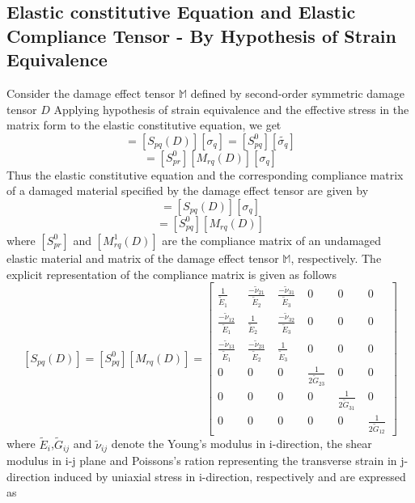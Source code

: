 \subsection{Elastic constitutive Equation and Elastic Compliance Tensor - By Hypothesis of Strain Equivalence}
\indent\indent\indent  Consider the damage effect tensor $\mathbb{M}$ defined by second-order symmetric damage tensor $D$ Applying hypothesis of strain equivalence and the effective stress in the matrix form to the elastic constitutive equation, we get
\begin{equation}
[\epsilon_{p}]  =  [S_{pq} (D)][\sigma_{q}]  =  [S_{pq}^{0}][\tilde{\sigma_{q}}]
\end{equation}
\begin{equation}
                =  [S_{pr}^{0}] [M_{rq} (D)][\sigma_{q}]
\end{equation}
Thus the elastic constitutive equation and the corresponding compliance matrix of a damaged material specified by the damage effect tensor are given by
\begin{equation}
[\epsilon_{p}]  =  [S_{pq} (D)][\sigma_{q}]
\end{equation}
\begin{equation}
[S_{pq} (D)]  = [S_{pq}^{0}][M_{rq} (D)]
\end{equation}
where $[S_{pr}^{0}]$  and $[M_{rq}^{1} (D)]$ are the compliance matrix of an undamaged elastic material and matrix of the damage effect tensor $\mathbb{M}$, respectively. The explicit representation of the compliance matrix is given as follows
$$
[S_{pq} (D)]  = [S_{pq}^{0}][M_{rq} (D)] =    
 \begin{bmatrix}
  \frac{1}{\tilde{E}_{1}} \; & \frac{-\tilde{\nu}_{21}}{\tilde{E}_{2}} \; & \frac{-\tilde{\nu}_{31}}{\tilde{E}_{3}} \; & 0 \; & 0\; & 0 \\
  \frac{-\tilde{\nu}_{12}}{\tilde{E}_{1}}\; & \frac{1}{\tilde{E}_{2}}\; & \frac{-\tilde{\nu}_{32}}{\tilde{E}_{3}}\; & 0\; & 0\; & 0 \\
  \frac{-\tilde{\nu}_{13}}{\tilde{E}_{1}}\; & \frac{-\tilde{\nu}_{23}}{\tilde{E}_{2}}\; & \frac{1}{\tilde{E}_{3}}\; & 0\; & 0\; & 0 \\
  0\; & 0\; & 0\;  & \frac{1}{2\tilde{G}_{23}}\; &0\; & 0 \\
  0\; & 0\; & 0\; & 0\; & \frac{1}{2\tilde{G}_{31}}\; & 0 \\
  0\; & 0\; & 0\; & 0\; & 0\; &\frac{1}{2\tilde{G}_{12}}  
 \end{bmatrix}
 $$
where  $\tilde{E}_{i}$,$\tilde{G}_{ij}$ and $\tilde{\nu}_{ij}$ denote the Young's modulus in i-direction, the shear modulus in i-j plane and Poissons's ration representing the transverse strain in j-direction induced by uniaxial stress in i-direction, respectively and are expressed as

